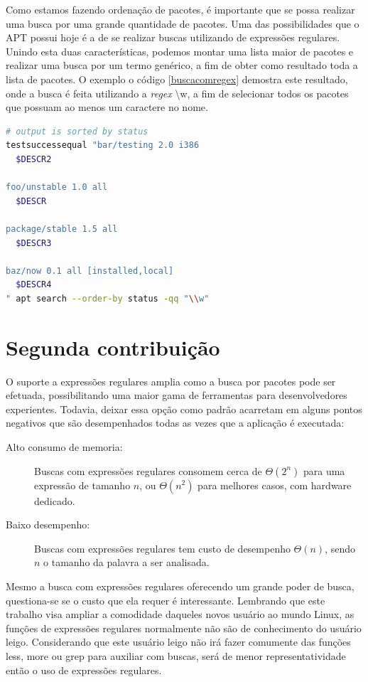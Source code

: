 Como estamos fazendo ordenação de pacotes, é importante que se possa realizar uma busca por uma grande quantidade de pacotes. Uma das possibilidades que o APT possui hoje é a de se realizar buscas utilizando de expressões regulares. Unindo esta duas características, podemos montar uma lista maior de pacotes e realizar uma busca por um termo genérico, a fim de obter como resultado toda a lista de pacotes. O exemplo o código \ref{buscacomregex} demostra este resultado, onde a busca é feita utilizando a \textit{regex} {\code \textbackslash w}, a fim de selecionar todos os pacotes que possuam ao menos um caractere no nome.

\begin{lstlisting}[language=Bash,label=buscacomregex,caption={Busca com uso de expressão regular}]
# output is sorted by status
testsuccessequal "bar/testing 2.0 i386
  $DESCR2

foo/unstable 1.0 all
  $DESCR

package/stable 1.5 all
  $DESCR3

baz/now 0.1 all [installed,local]
  $DESCR4
" apt search --order-by status -qq "\\w"
\end{lstlisting}



\section{Segunda contribuição} %
\label{sec:segunda_contribui_o}

O suporte a expressões regulares amplia como a busca por pacotes pode ser efetuada, possibilitando uma maior gama de ferramentas para desenvolvedores experientes. Todavia, deixar essa opção como padrão acarretam em alguns pontos negativos que são desempenhados todas as vezes que a aplicação é executada:

\begin{description}
	\item [Alto consumo de memoria:] Buscas com expressões regulares consomem cerca de $\Theta(2^n)$ para uma expressão de tamanho $n$, ou $\Theta(n^2)$ para melhores casos, com hardware dedicado\cite{sidhu2001fast}.
	\item [Baixo desempenho:] Buscas com expressões regulares tem custo de desempenho $\Theta(n)$, sendo $n$ o tamanho da palavra a ser analisada.
\end{description}

Mesmo a busca com expressões regulares oferecendo um grande poder de busca, questiona-se se o custo que ela requer é interessante. Lembrando que este trabalho visa ampliar a comodidade daqueles novos usuário ao mundo Linux, as funções de expressões regulares normalmente não são de conhecimento do usuário leigo. Considerando que este usuário leigo não irá fazer comumente das funções {\code less}, {\code more} ou {\code grep} para auxiliar com buscas, será de menor representatividade então o uso de expressões regulares.

